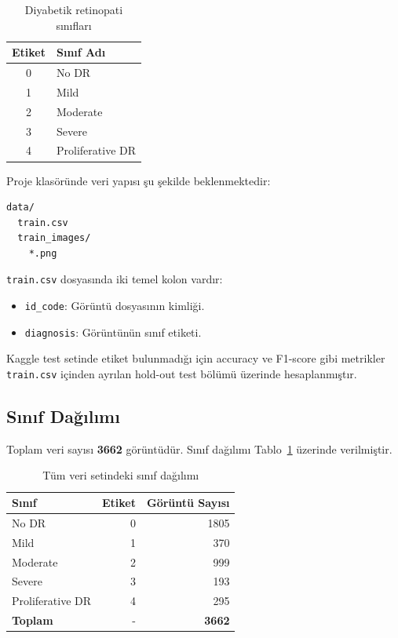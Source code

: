 \documentclass[12pt,a4paper]{article}
\begin{document}
\begin{table}[H]
\centering
\caption{Diyabetik retinopati sınıfları}
\begin{tabular}{cl}
\toprule
\textbf{Etiket} & \textbf{Sınıf Adı} \\
\midrule
0 & No DR \\
1 & Mild \\
2 & Moderate \\
3 & Severe \\
4 & Proliferative DR \\
\bottomrule
\end{tabular}
\end{table}

Proje klasöründe veri yapısı şu şekilde beklenmektedir:

\begin{verbatim}
data/
  train.csv
  train_images/
    *.png
\end{verbatim}

\texttt{train.csv} dosyasında iki temel kolon vardır:

\begin{itemize}
    \item \texttt{id\_code}: Görüntü dosyasının kimliği.
    \item \texttt{diagnosis}: Görüntünün sınıf etiketi.
\end{itemize}

Kaggle test setinde etiket bulunmadığı için accuracy ve F1-score gibi metrikler \texttt{train.csv} içinden ayrılan hold-out test bölümü üzerinde hesaplanmıştır.

\subsection{Sınıf Dağılımı}

Toplam veri sayısı \textbf{3662} görüntüdür. Sınıf dağılımı Tablo~\ref{tab:dataset_distribution} üzerinde verilmiştir.

\begin{table}[H]
\centering
\caption{Tüm veri setindeki sınıf dağılımı}
\label{tab:dataset_distribution}
\begin{tabular}{lrr}
\toprule
\textbf{Sınıf} & \textbf{Etiket} & \textbf{Görüntü Sayısı} \\
\midrule
No DR & 0 & 1805 \\
Mild & 1 & 370 \\
Moderate & 2 & 999 \\
Severe & 3 & 193 \\
Proliferative DR & 4 & 295 \\
\midrule
\textbf{Toplam} & - & \textbf{3662} \\
\bottomrule
\end{tabular}
\end{table}
\end{document}
